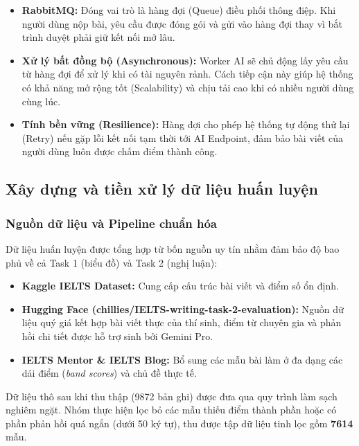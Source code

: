 \begin{itemize}
    \item \textbf{RabbitMQ:} Đóng vai trò là hàng đợi (Queue) điều phối thông điệp. Khi người dùng nộp bài, yêu cầu được đóng gói và gửi vào hàng đợi thay vì bắt trình duyệt phải giữ kết nối mở lâu.
    \item \textbf{Xử lý bất đồng bộ (Asynchronous):} Worker AI sẽ chủ động lấy yêu cầu từ hàng đợi để xử lý khi có tài nguyên rảnh. Cách tiếp cận này giúp hệ thống có khả năng mở rộng tốt (Scalability) và chịu tải cao khi có nhiều người dùng cùng lúc.
    \item \textbf{Tính bền vững (Resilience):} Hàng đợi cho phép hệ thống tự động thử lại (Retry) nếu gặp lỗi kết nối tạm thời tới AI Endpoint, đảm bảo bài viết của người dùng luôn được chấm điểm thành công.
\end{itemize}

\subsection{Xây dựng và tiền xử lý dữ liệu huấn luyện}

\subsubsection{Nguồn dữ liệu và Pipeline chuẩn hóa}
Dữ liệu huấn luyện được tổng hợp từ bốn nguồn uy tín nhằm đảm bảo độ bao phủ về cả Task 1 (biểu đồ) và Task 2 (nghị luận):
\begin{itemize}
    \item \textbf{Kaggle IELTS Dataset:} Cung cấp cấu trúc bài viết và điểm số ổn định.
    \item \textbf{Hugging Face (chillies/IELTS-writing-task-2-evaluation):} Nguồn dữ liệu quý giá kết hợp bài viết thực của thí sinh, điểm từ chuyên gia và phản hồi chi tiết được hỗ trợ sinh bởi Gemini Pro.
    \item \textbf{IELTS Mentor \& IELTS Blog:} Bổ sung các mẫu bài làm ở đa dạng các dải điểm (\textit{band scores}) và chủ đề thực tế.
\end{itemize}

Dữ liệu thô sau khi thu thập (9872 bản ghi) được đưa qua quy trình làm sạch nghiêm ngặt. Nhóm thực hiện lọc bỏ các mẫu thiếu điểm thành phần hoặc có phần phản hồi quá ngắn (dưới 50 ký tự), thu được tập dữ liệu tinh lọc gồm \textbf{7614} mẫu.

